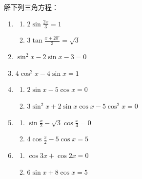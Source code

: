 \begin{ex}
解下列三角方程：
\begin{enumerate}
    \item \begin{enumerate}
        \item $2\sin\frac{2x}{3}=1$
        \item $3\tan\frac{x+20^{\circ}}{3}=\sqrt{3}$
    \end{enumerate}
    \item $\sin^2x-2\sin x-3=0$
    \item $4\cos^2 x-4\sin x=1$
    \item \begin{enumerate}
        \item $2\sin x-5\cos x=0$
        \item $3\sin^2 x+2\sin x\cos x-5\cos^2 x=0$
    \end{enumerate}
    \item \begin{enumerate}
        \item $\sin\frac{x}{2}-\sqrt{3}\cos\frac{x}{4}=0$
        \item $4\cos\frac{x}{2}-5\cos x=5$
    \end{enumerate}
    \item \begin{enumerate}
        \item $\cos 3x+\cos 2x=0$
        \item $6\sin x+8\cos x=5$
    \end{enumerate}
\end{enumerate}
\end{ex}

